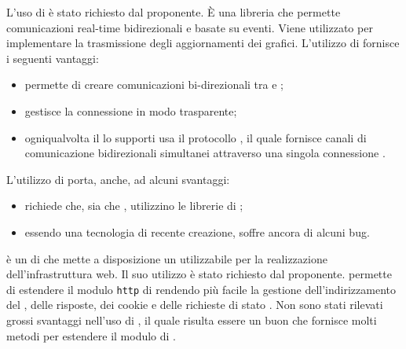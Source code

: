 L'uso di  è stato richiesto dal proponente. È una libreria  che permette comunicazioni real-time bidirezionali e basate su eventi. Viene utilizzato per implementare la trasmissione degli aggiornamenti dei grafici.
L'utilizzo di  fornisce i seguenti vantaggi:
\begin{itemize}
\item permette di creare comunicazioni bi-direzionali tra  e ;
\item gestisce la connessione in modo trasparente;
\item ogniqualvolta il  lo supporti usa il protocollo , il quale fornisce canali di comunicazione bidirezionali simultanei attraverso una singola connessione .
\end{itemize}
L'utilizzo di  porta, anche, ad alcuni svantaggi:
\begin{itemize}
	\item richiede che, sia  che , utilizzino le librerie di ;
	\item essendo una tecnologia di recente creazione, soffre ancora di alcuni bug.
\end{itemize}

 è un  di  che mette a disposizione un  utilizzabile per la realizzazione dell'infrastruttura web. Il suo utilizzo è stato richiesto dal proponente.
 permette di estendere il modulo \texttt{http} di  rendendo più facile la gestione dell'indirizzamento del , delle risposte, dei cookie e delle richieste di stato .
Non sono stati rilevati grossi svantaggi nell'uso di , il quale risulta essere un buon  che fornisce molti metodi per estendere il modulo  di .

